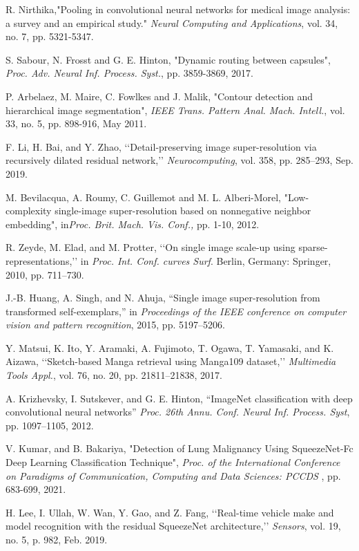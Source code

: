 \documentclass{ieeeaccess}
\begin{document}
\begin{thebibliography}{00}
 R. Nirthika,"Pooling in convolutional neural networks for medical image analysis: a survey and an empirical study." \textit{Neural Computing and Applications}, vol. 34, no. 7, pp.  5321-5347.


 S. Sabour, N. Frosst and G. E. Hinton, "Dynamic routing between capsules", \textit{Proc. Adv. Neural Inf. Process. Syst.}, pp. 3859-3869, 2017.


 P. Arbelaez, M. Maire, C. Fowlkes and J. Malik, "Contour detection and hierarchical image segmentation", \textit {IEEE Trans. Pattern Anal. Mach. Intell.}, vol. 33, no. 5, pp. 898-916, May 2011.


 F. Li, H. Bai, and Y. Zhao, ‘‘Detail-preserving image super-resolution via recursively dilated residual network,’’ \textit {Neurocomputing}, vol. 358, pp. 285–293, Sep. 2019.


 M. Bevilacqua, A. Roumy, C. Guillemot and M. L. Alberi-Morel, "Low-complexity single-image super-resolution based on nonnegative neighbor embedding", in\textit{Proc. Brit. Mach. Vis. Conf.,} pp. 1-10, 2012.

 R. Zeyde, M. Elad, and M. Protter, ‘‘On single image scale-up using sparse-representations,’’ in \textit {Proc. Int. Conf. curves Surf}. Berlin, Germany: Springer, 2010, pp. 711–730.


 J.-B. Huang, A. Singh, and N. Ahuja, “Single image super-resolution from transformed self-exemplars,” in \textit {Proceedings of the IEEE conference on computer vision and pattern recognition}, 2015, pp. 5197–5206.


 Y. Matsui, K. Ito, Y. Aramaki, A. Fujimoto, T. Ogawa, T. Yamasaki, and K. Aizawa, ‘‘Sketch-based Manga retrieval using Manga109 dataset,’’ \textit {Multimedia Tools Appl.}, vol. 76, no. 20, pp. 21811–21838, 2017.



 A. Krizhevsky, I. Sutskever, and G. E. Hinton, “ImageNet classification with deep convolutional neural networks” \textit{ Proc. 26th Annu. Conf. Neural Inf. Process. Syst},  pp. 1097–1105, 2012.

 V. Kumar, and B. Bakariya, "Detection of Lung Malignancy Using SqueezeNet-Fc Deep Learning Classification Technique",  \textit{Proc. of the International Conference on Paradigms of Communication, Computing and Data Sciences: PCCDS }, pp. 683-699, 2021.
    
  H. Lee, I. Ullah, W. Wan, Y. Gao, and Z. Fang, ‘‘Real-time vehicle make and model recognition with the residual SqueezeNet architecture,’’ \textit{Sensors}, vol. 19, no. 5, p. 982, Feb. 2019.


\end{thebibliography}
\end{document}
